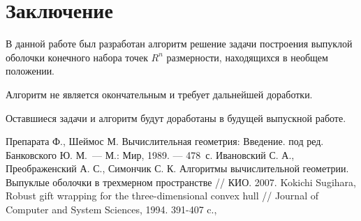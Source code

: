 \documentclass[a4paper,14pt]{extarticle}  %
\begin{document}
\section*{Заключение}
В данной работе был разработан алгоритм решение задачи построения выпуклой оболочки конечного набора точек $R^n$ размерности, находящихся в необщем положении.



Алгоритм не является окончательным и требует дальнейшей доработки.

Оставшиеся задачи и алгоритм будут доработаны в будущей выпускной работе.
\newpage

\newpage
{}
\begin{thebibliography}{}
	 Препарата Ф., Шеймос М. Вычислительная геометрия: Введение. под ред. Банковского Ю. М.~--- М.: Мир, 1989. --- 478~с.
     Ивановский С. А., Преображенский А. С., Симончик С. К. Алгоритмы вычислительной геометрии. Выпуклые оболочки в трехмерном пространстве // КИО. 2007.
     Kokichi Sugihara,
    Robust gift wrapping for the three-dimensional convex hull //
    Journal of Computer and System Sciences,
    1994.
    391-407 c.,
\end{thebibliography}
\end{document}
